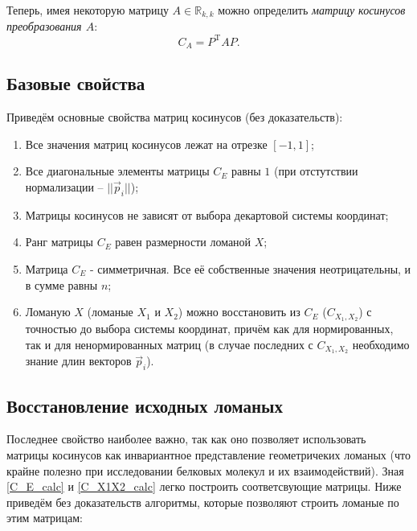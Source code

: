 Теперь, имея некоторую матрицу $A \in \mathbb{R}_{k, k}$ можно определить \textit{матрицу косинусов преобразования $A$}:
\begin{equation}
	C_A = P^\mathrm{T}AP.
	\label{C_A_calc}
\end{equation}

\subsection{Базовые свойства}
Приведём основные свойства матриц косинусов (без доказательств):
\begin{enumerate}
\item Все значения матриц косинусов лежат на отрезке $[-1, 1]$;
\item Все диагональные элементы матрицы $C_E$ равны $1$ (при отстутствии нормализации -- $||\vec{p}_i||$);
\item Матрицы косинусов не зависят от выбора декартовой системы координат;
\item Ранг матрицы $C_E$ равен размерности ломаной $X$;
\item Матрица $C_E$ - симметричная. Все её собственные значения неотрицательны, и в сумме равны $n$;
\item Ломаную $X$ (ломаные $X_1$ и $X_2$) можно восстановить из $C_E$ ($C_{X_1, X_2}$) с точностью до выбора системы координат, причём как для нормированных, так и для ненормированных матриц (в случае последних с $C_{X_1, X_2}$ необходимо знание длин векторов $\vec{p}_i$).
\end{enumerate}

\subsection{Восстановление исходных ломаных}
Последнее свойство наиболее важно, так как оно позволяет использовать матрицы косинусов как инвариантное представление геометричеких ломаных (что крайне полезно при исследовании белковых молекул и их взаимодействий). Зная \ref{C_E_calc} и \ref{C_X1X2_calc} легко построить соответсвующие матрицы. Ниже приведём без доказательств алгоритмы, которые позволяют строить ломаные по этим матрицам:

